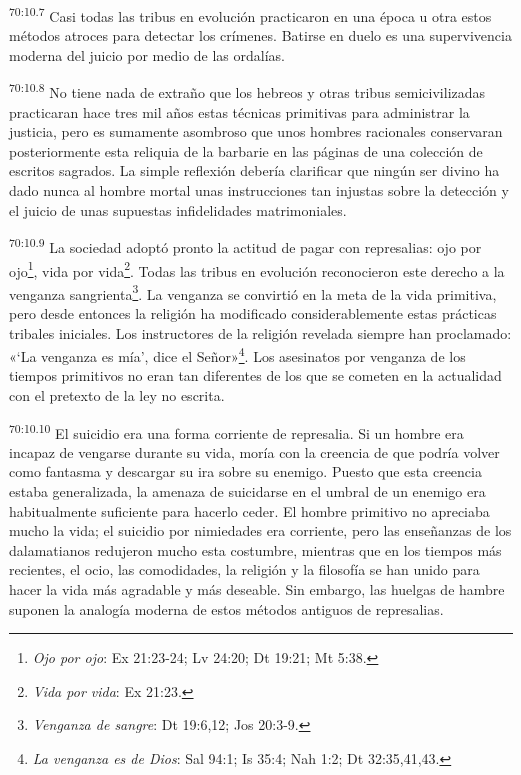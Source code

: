 \par
\textsuperscript{70:10.7} Casi todas las tribus en evolución practicaron en una época u otra estos métodos atroces para detectar los crímenes. Batirse en duelo es una supervivencia moderna del juicio por medio de las ordalías.

\par
\textsuperscript{70:10.8} No tiene nada de extraño que los hebreos y otras tribus semicivilizadas practicaran hace tres mil años estas técnicas primitivas para administrar la justicia, pero es sumamente asombroso que unos hombres racionales conservaran posteriormente esta reliquia de la barbarie en las páginas de una colección de escritos sagrados. La simple reflexión debería clarificar que ningún ser divino ha dado nunca al hombre mortal unas instrucciones tan injustas sobre la detección y el juicio de unas supuestas infidelidades matrimoniales.

\par
\textsuperscript{70:10.9} La sociedad adoptó pronto la actitud de pagar con represalias: ojo por ojo\footnote{\textit{Ojo por ojo}: Ex 21:23-24; Lv 24:20; Dt 19:21; Mt 5:38.}, vida por vida\footnote{\textit{Vida por vida}: Ex 21:23.}. Todas las tribus en evolución reconocieron este derecho a la venganza sangrienta\footnote{\textit{Venganza de sangre}: Dt 19:6,12; Jos 20:3-9.}. La venganza se convirtió en la meta de la vida primitiva, pero desde entonces la religión ha modificado considerablemente estas prácticas tribales iniciales. Los instructores de la religión revelada siempre han proclamado: «`La venganza es mía', dice el Señor»\footnote{\textit{La venganza es de Dios}: Sal 94:1; Is 35:4; Nah 1:2; Dt 32:35,41,43.}. Los asesinatos por venganza de los tiempos primitivos no eran tan diferentes de los que se cometen en la actualidad con el pretexto de la ley no escrita.

\par
\textsuperscript{70:10.10} El suicidio era una forma corriente de represalia. Si un hombre era incapaz de vengarse durante su vida, moría con la creencia de que podría volver como fantasma y descargar su ira sobre su enemigo. Puesto que esta creencia estaba generalizada, la amenaza de suicidarse en el umbral de un enemigo era habitualmente suficiente para hacerlo ceder. El hombre primitivo no apreciaba mucho la vida; el suicidio por nimiedades era corriente, pero las enseñanzas de los dalamatianos redujeron mucho esta costumbre, mientras que en los tiempos más recientes, el ocio, las comodidades, la religión y la filosofía se han unido para hacer la vida más agradable y más deseable. Sin embargo, las huelgas de hambre suponen la analogía moderna de estos métodos antiguos de represalias.

